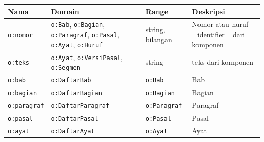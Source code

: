 \begin{longtable}{|p{}|p{}|p{}|p{}|}
  \hline
  \textbf{Nama}              & \textbf{Domain}                                                                                                                  & \textbf{Range}                                        & \textbf{Deskripsi}                                \\ \hline \endhead
  \texttt{o:nomor}           & \texttt{o:Bab}, \texttt{o:Bagian}, \texttt{o:Paragraf}, \texttt{o:Pasal}, \texttt{o:Ayat}, \texttt{o:Huruf}                      & string, bilangan                                      & Nomor atau huruf \_identifier\_ dari komponen     \\ \hline
  \texttt{o:teks}            & \texttt{o:Ayat}, \texttt{o:VersiPasal}, \texttt{o:Segmen}                                                                        & string                                                & teks dari komponen                                \\ \hline
  \texttt{o:bab}             & \texttt{o:DaftarBab}                                                                                                             & \texttt{o:Bab}                                        & Bab                                               \\ \hline
  \texttt{o:bagian}          & \texttt{o:DaftarBagian}                                                                                                          & \texttt{o:Bagian}                                     & Bagian                                            \\ \hline
  \texttt{o:paragraf}        & \texttt{o:DaftarParagraf}                                                                                                        & \texttt{o:Paragraf}                                   & Paragraf                                          \\ \hline
  \texttt{o:pasal}           & \texttt{o:DaftarPasal}                                                                                                           & \texttt{o:Pasal}                                      & Pasal                                             \\ \hline
  \texttt{o:ayat}            & \texttt{o:DaftarAyat}                                                                                                            & \texttt{o:Ayat}                                       & Ayat                                              \\ \hline

\end{longtable}

